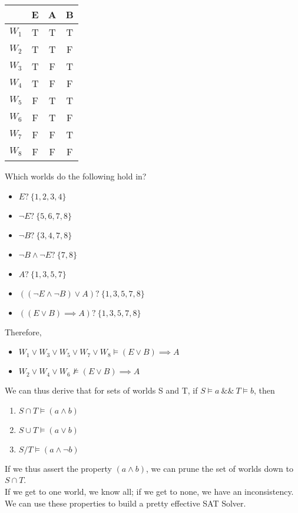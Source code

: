 \documentclass[../../lecture_notes.tex]{subfiles}
\begin{document}
\begin{center} \begin{minipage}{0.2\textwidth}
\begin{tabular}{ | c || c | c | c | }
	\hline
	& E & A & B\\
	\hline\hline
	$W_1$ & T & T & T \\
	\hline
	$W_2$ & T & T & F \\
	\hline
	$W_3$ & T & F & T \\
	\hline
	$W_4$ & T & F & F \\
	\hline
	$W_5$ & F & T & T \\
	\hline
	$W_6$ & F & T & F \\
	\hline
	$W_7$ & F & F & T \\
	\hline
	$W_8$ & F & F & F \\
	\hline
\end{tabular} 
\end{minipage}%
\begin{minipage}{0.8\textwidth}
\noindent Which worlds do the following hold in?
\begin{itemize} [itemsep=0mm]
	\item $E ?\  \{1, 2, 3, 4\}$
	\item $\neg E ?\  \{5, 6, 7, 8\}$
	\item $\neg B ?\  \{3, 4, 7, 8\}$
	\item $\neg B \land \neg E ?\  \{7, 8\}$
	\item $A ?\  \{1, 3, 5, 7\}$
	\item $((\neg E \land \neg B) \lor A) ?\ \{1, 3, 5, 7, 8\}$
	\item $((E \lor B) \implies A )?\  \{1, 3, 5, 7, 8\}$
\end{itemize}
Therefore, \begin{itemize} [itemsep=0mm]
	\item $ W_1 \lor W_3 \lor W_5 \lor W_7 \lor W_8 \models (E \lor B) \implies A $
	\item $ W_2 \lor W_4 \lor W_6 \not\models (E \lor B) \implies A $
\end{itemize}
\end{minipage} \end{center}

\noindent We can thus derive that for sets of worlds S and T, if $S \models a \ \&\&\  T \models b$, then 
\begin{enumerate} [itemsep=0mm]
	\item $S \cap T \models (a \land b) $
	\item $S \cup T \models (a \lor b)$
	\item $S / T \models (a \land \neg b)$
\end{enumerate} 
\noindent If we thus assert the property $(a \land b)$, we can prune the set of worlds down to $S \cap T$.\\
If we get to one world, we know all; if we get to none, we have an inconsistency.\\
We can use these properties to build a pretty effective SAT Solver.\\
\end{document}
